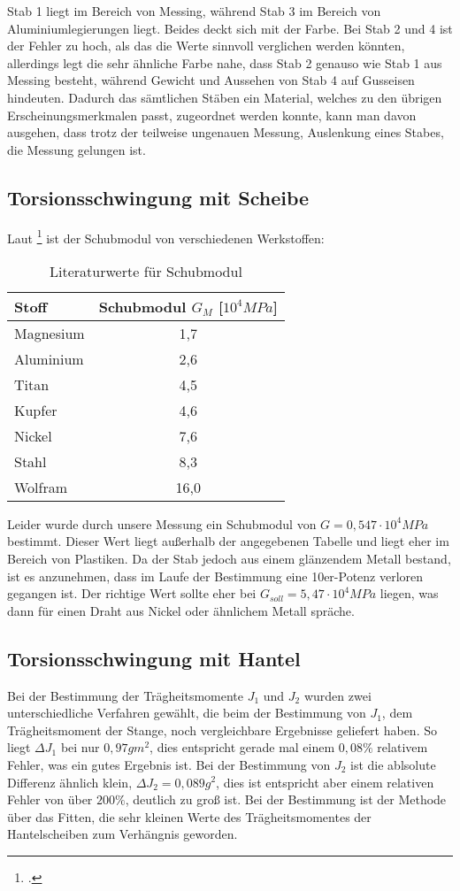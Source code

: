 Stab 1 liegt im Bereich von Messing, während Stab 3 im Bereich von Aluminiumlegierungen liegt. Beides deckt sich mit der Farbe. Bei Stab 2 und 4 ist der Fehler zu hoch, als das die Werte sinnvoll verglichen werden könnten, allerdings legt die sehr ähnliche Farbe nahe, dass Stab 2 genauso wie Stab 1 aus Messing besteht, während Gewicht und Aussehen von Stab 4 auf Gusseisen hindeuten.
Dadurch das sämtlichen Stäben ein Material, welches zu den übrigen Erscheinungsmerkmalen passt, zugeordnet werden konnte, kann man davon ausgehen, dass trotz der teilweise ungenauen Messung, Auslenkung eines Stabes, die Messung gelungen ist.
\subsection{Torsionsschwingung mit Scheibe}
Laut \footcite{elektrotechnik} ist der Schubmodul von verschiedenen Werkstoffen:


\begin{table}[H]
  \centering
  \begin{tabular}{l | c}
    Stoff & Schubmodul $G_M$ [$10^4MPa$] \\ \hline
    Magnesium & 1,7 \\
    Aluminium & 2,6 \\
    Titan & 4,5 \\
    Kupfer & 4,6 \\
    Nickel & 7,6 \\
    Stahl & 8,3 \\
    Wolfram & 16,0
  \end{tabular}
  \caption{Literaturwerte für Schubmodul}
  \label{tab:litwertschub}
\end{table}

Leider wurde durch unsere Messung ein Schubmodul von $G=0,547\cdot10^4 MPa$ bestimmt. Dieser Wert liegt außerhalb der angegebenen Tabelle und liegt eher im Bereich von Plastiken. Da der Stab jedoch aus einem glänzendem Metall bestand, ist es anzunehmen, dass im Laufe der Bestimmung eine 10er-Potenz verloren gegangen ist. Der richtige Wert sollte eher bei $G_{soll}=5,47\cdot10^4 MPa$ liegen, was dann für einen Draht aus Nickel oder ähnlichem Metall spräche.

\subsection{Torsionsschwingung mit Hantel}
Bei der Bestimmung der Trägheitsmomente $J_1$ und $J_2$ wurden zwei unterschiedliche Verfahren gewählt, die beim der Bestimmung von $J_1$, dem Trägheitsmoment der Stange, noch vergleichbare Ergebnisse geliefert haben. So liegt $\Delta J_1$ bei nur $0,97gm^2$, dies entspricht gerade mal einem $0,08\%$ relativem Fehler, was ein gutes Ergebnis ist.
Bei der Bestimmung von $J_2$ ist die ablsolute Differenz ähnlich klein, $\Delta J_2=0,089g^2$, dies ist entspricht aber einem relativen Fehler von über $200\%$, deutlich zu groß ist. 
Bei der Bestimmung ist der Methode über das Fitten, die sehr kleinen Werte des Trägheitsmomentes der Hantelscheiben zum Verhängnis geworden.
